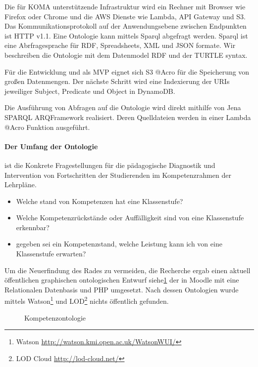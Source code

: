 \documentclass[
12pt,
english,
ngerman,
headsepline,
twoside,
openright,
numbers=noenddot,version=first
]{scrreprt}
\begin{document}
Die für KOMA unterstützende Infrastruktur wird ein Rechner mit Browser wie Firefox oder Chrome und die AWS Dienste wie Lambda, API Gateway und S3. Das Kommunikationsprotokoll auf der Anwendungsebene zwischen Endpunkten ist HTTP v1.1.
Eine Ontologie kann mittels Sparql abgefragt werden. Sparql ist eine Abrfragesprache für RDF, Spreadsheets, XML und JSON formate\cite{SparqlLearn}. Wir beschreiben die Ontologie mit dem Datenmodel RDF und der TURTLE syntax.

Für die Entwicklung und als MVP eignet sich S3 @Acro für die Speicherung von großen Datenmengen. Der nächste Schritt wird eine Indexierung der URIs jeweiliger Subject, Predicate und Object in DynamoDB. 

Die Ausführung von Abfragen auf die Ontologie wird direkt mithilfe von \glqq Jena SPARQL ARQ\grqq Framework realisiert. Deren Quelldateien werden in einer Lambda @Acro Funktion ausgeführt.

\paragraph{Der Umfang der Ontologie} ist die Konkrete Fragestellungen für die pädagogische Diagnostik und Intervention von Fortschritten der Studierenden im Kompetenzrahmen der Lehrpläne.

\begin{itemize}
	\item Welche stand von Kompetenzen hat eine Klassenstufe?
	\item Welche Kompetenzrückstände oder Auffälligkeit sind von eine Klassenstufe erkennbar?
	\item gegeben sei ein Kompetenzstand, welche Leistung kann ich von eine Klassenstufe erwarten?
\end{itemize}


Um die Neuerfindung des Rades zu vermeiden, die Recherche ergab einen aktuell öffentlichen graphischen ontologischen Entwurf\cite{OntoMoodle} siehe\ref{fig:competence-ontology} der in Moodle mit eine Relationalen Datenbasis und PHP umgesetzt. Nach dessen Ontologien wurde mittels Watson\footnote{Watson \url{http://watson.kmi.open.ac.uk/WatsonWUI/}} und LOD\footnote{LOD Cloud \url{http://lod-cloud.net/}} nichts öffentlich gefunden. 

\begin{figure}
	\centering
\caption{Kompetenzontologie}
\label{fig:competence-ontology}
\end{figure}
\end{document}
